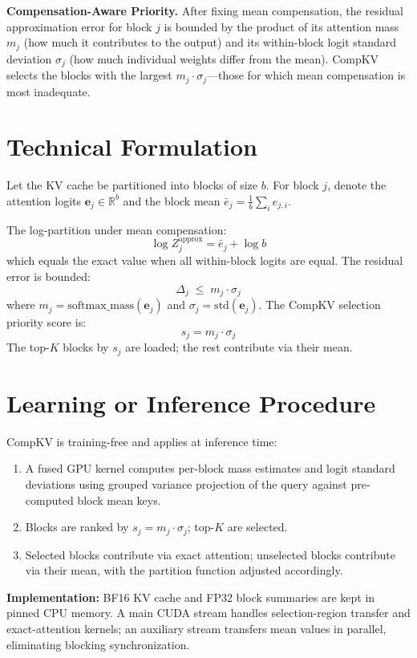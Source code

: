 \documentclass[10pt,twocolumn]{article}
\begin{document}
\textbf{Compensation-Aware Priority.} After fixing mean compensation, the
residual approximation error for block $j$ is bounded by the product of its
attention mass $m_j$ (how much it contributes to the output) and its within-block
logit standard deviation $\sigma_j$ (how much individual weights differ from the
mean). CompKV selects the blocks with the largest $m_j \cdot \sigma_j$---those
for which mean compensation is most inadequate.

\section{Technical Formulation}

Let the KV cache be partitioned into blocks of size $b$. For block $j$, denote
the attention logits $\mathbf{e}_j \in \mathbb{R}^b$ and the block mean
$\bar{e}_j = \frac{1}{b}\sum_i e_{j,i}$.

The log-partition under mean compensation:
\[
\log Z_j^{\text{approx}} = \bar{e}_j + \log b
\]
which equals the exact value when all within-block logits are equal. The
residual error is bounded:
\[
\Delta_j \;\leq\; m_j \cdot \sigma_j
\]
where $m_j = \mathrm{softmax\_mass}(\mathbf{e}_j)$ and
$\sigma_j = \mathrm{std}(\mathbf{e}_j)$. The CompKV selection priority score is:
\[
s_j = m_j \cdot \sigma_j
\]
The top-$K$ blocks by $s_j$ are loaded; the rest contribute via their mean.

\section{Learning or Inference Procedure}

CompKV is training-free and applies at inference time:

\begin{enumerate}[itemsep=2pt,parsep=0pt]
  \item A fused GPU kernel computes per-block mass estimates and logit
    standard deviations using grouped variance projection of the query
    against pre-computed block mean keys.
  \item Blocks are ranked by $s_j = m_j \cdot \sigma_j$; top-$K$ are selected.
  \item Selected blocks contribute via exact attention; unselected blocks
    contribute via their mean, with the partition function adjusted accordingly.
\end{enumerate}

\textbf{Implementation:} BF16 KV cache and FP32 block summaries are kept in
pinned CPU memory. A main CUDA stream handles selection-region transfer and
exact-attention kernels; an auxiliary stream transfers mean values in parallel,
eliminating blocking synchronization.
\end{document}
